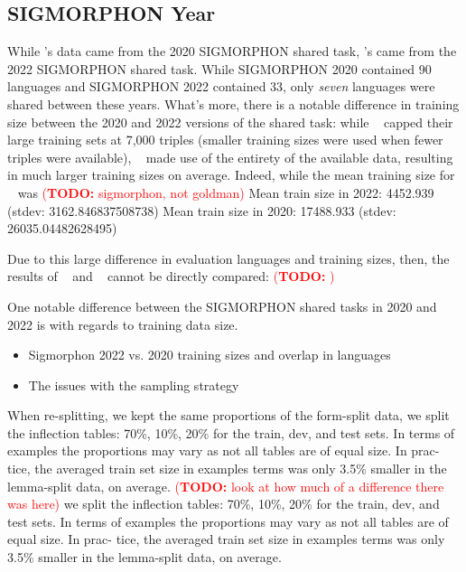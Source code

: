 \documentclass[11pt]{article}
\newcommand{\todo}[1]{\textcolor{red}{(\textbf{TODO:} #1)}}
\newcommand{\goldmana}{\citeauthor{goldman-etal-2022-un}}
\newcommand{\kodnera}{\citeauthor{kodner-etal-2022-sigmorphon}}
\begin{document}
\subsection{SIGMORPHON Year }

While \goldmana's data came from the 2020 SIGMORPHON shared task, \kodnera's came from the 2022 SIGMORPHON shared task. 
While SIGMORPHON 2020 contained 90 languages and SIGMORPHON 2022 contained 33, only \textit{seven} languages were shared between these years.
What's more, there is a notable difference in training size between the 2020 and 2022 versions of the shared task: while \kodnera~ capped their large training sets at 7,000 triples (smaller training sizes were used when fewer triples were available), \goldmana~ made use of the entirety of the available data, resulting in much larger training sizes on average.
Indeed, while the mean training size for \goldmana~ was 
\todo{sigmorphon, not goldman}
Mean train size in 2022: 4452.939 (stdev: 3162.846837508738)
Mean train size in 2020: 17488.933 (stdev: 26035.04482628495)

Due to this large difference in evaluation languages and training sizes, then, the results of \goldmana~ and \kodnera~ cannot be directly compared: \todo{} 



One notable difference between the SIGMORPHON shared tasks in 2020 and 2022 is with regards to training data size.

\begin{itemize}
\item Sigmorphon 2022 vs. 2020 training sizes and overlap in languages
\item The issues with the \goldmana sampling strategy 
\end{itemize}


When re-splitting, we kept the same proportions of the form-split data, we split the inflection tables: 70\%, 10\%, 20\% for the train, dev, and test sets. 
In terms of examples the proportions may vary as not all tables are of equal size. In prac- tice, the averaged train set size in examples terms was only 3.5\% smaller in the lemma-split data, on average.
\todo{look at how much of a difference there was here}
we split the inflection tables: 70\%, 10\%, 20\% for the train, dev, and test sets. 
In terms of examples the proportions may vary as not all tables are of equal size. In prac- tice, the averaged train set size in examples terms was only 3.5\% smaller in the lemma-split data, on average.
\end{document}
